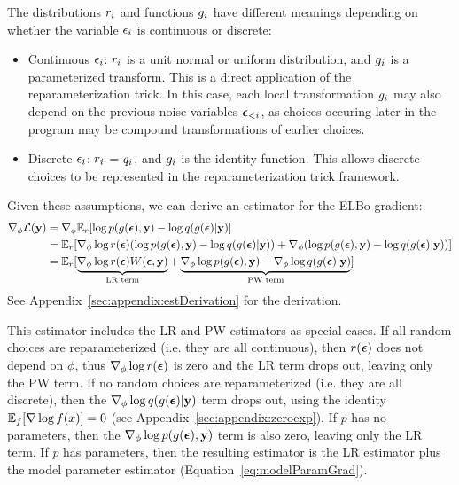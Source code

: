 The distributions $r_i$ and functions $g_i$ have different meanings depending on whether the variable $\epsilon_i$ is continuous or discrete:
\begin{itemize}
\item{Continuous $\epsilon_i$: $r_i$ is a unit normal or uniform distribution, and $g_i$ is a parameterized transform. This is a direct application of the reparameterization trick. In this case, each local transformation $g_i$ may also depend on the previous noise variables $\bm{\epsilon}_{<i}$, as choices occuring later in the program may be compound transformations of earlier choices.~}
\item{Discrete $\epsilon_i$: $r_i$ = $q_i$, and $g_i$ is the identity function. This allows discrete choices to be represented in the reparameterization trick framework.}
\end{itemize}
Given these assumptions, we can derive an estimator for the ELBo gradient:
\begin{align}
\label{eq:hybridEstimator}
\nabla_\phi \mathcal{L}(\mathbf{y})
&= \nabla_\phi \mathbb{E}_{r} [ \log p(g(\bm{\epsilon}), \mathbf{y}) - \log q(g(\bm{\epsilon}) | \mathbf{y}) ]\\
&= \mathbb{E}_{r} [ \nabla_\phi \log r(\bm{\epsilon}) ( \log p(g(\bm{\epsilon}), \mathbf{y}) - \log q(g(\bm{\epsilon}) | \mathbf{y}) ) + \nabla_\phi( \log p(g(\bm{\epsilon}), \mathbf{y}) - \log q(g(\bm{\epsilon}) | \mathbf{y}) )]\nonumber\\
&= \mathbb{E}_{r} [ \underbrace{\nabla_\phi \log r(\bm{\epsilon}) W(\bm{\epsilon}, \mathbf{y})}_{\text{LR term}} + \underbrace{\nabla_\phi \log p(g(\bm{\epsilon}), \mathbf{y}) - \nabla_\phi \log q(g(\bm{\epsilon}) | \mathbf{y})}_{\text{PW term}} ]\nonumber
\end{align}
See Appendix~\ref{sec:appendix:estDerivation} for the derivation. 

This estimator includes the LR and PW estimators as special cases. If all random choices are reparameterized (i.e. they are all continuous), then $r(\bm{\epsilon})$ does not depend on $\phi$, thus $\nabla_\phi \log r(\bm{\epsilon})$ is zero and the LR term drops out, leaving only the PW term. If no random choices are reparameterized (i.e. they are all discrete), then the $\nabla_\phi \log q(g(\bm{\epsilon}) | \mathbf{y})$ term drops out, using the identity $\mathbb{E}_f[\nabla \log f(x)] = 0$ (see Appendix~\ref{sec:appendix:zeroexp}). If $p$ has no parameters, then the $\nabla_\phi \log p(g(\bm{\epsilon}), \mathbf{y})$ term is also zero, leaving only the LR term. If $p$ has parameters, then the resulting estimator is the LR estimator plus the model parameter estimator (Equation~\ref{eq:modelParamGrad}).

